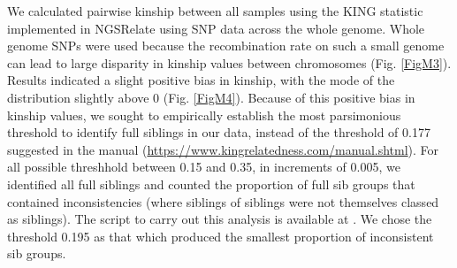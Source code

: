 \documentclass[a4paper,12pt]{article}
\begin{document}
We calculated pairwise kinship between all samples using the KING statistic \parencite{Man10} implemented in NGSRelate \parencite{Kor15} using SNP data across the whole genome. Whole genome SNPs were used because the recombination rate on such a small genome can lead to large disparity in kinship values between chromosomes (Fig. \ref{FigM3}). Results indicated a slight positive bias in kinship, with the mode of the distribution slightly above 0 (Fig. \ref{FigM4}). Because of this positive bias in kinship values, we sought to empirically establish the most parsimonious threshold to identify full siblings in our data, instead of the threshold of 0.177 suggested in the manual (\url{https://www.kingrelatedness.com/manual.shtml}). For all possible threshhold between 0.15 and 0.35, in increments of 0.005, we identified all full siblings and counted the proportion of full sib groups that contained inconsistencies (where siblings of siblings were not themselves classed as siblings). The script to carry out this analysis is available at . We chose the threshold 0.195 as that which produced the smallest proportion of inconsistent sib groups. 
\end{document}

